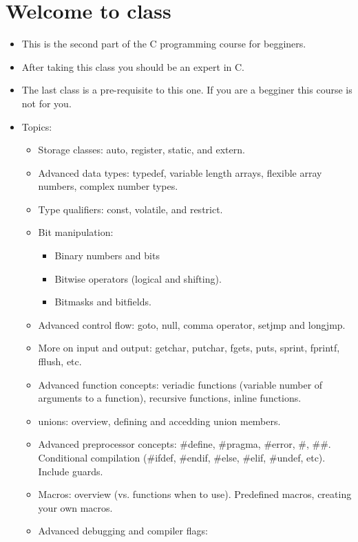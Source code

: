 \section{Welcome to class}
\begin{itemize}
    \item This is the second part of the C programming course for begginers.
    \item After taking this class you should be an expert in C.
    \item The last class is a pre-requisite to this one. If you are a begginer this course is not for you.
    \item Topics:
        \begin{itemize}
            \item Storage classes: auto, register, static, and extern.
            \item Advanced data types: typedef, variable length arrays, flexible array numbers, complex number types.
            \item Type qualifiers: const, volatile, and restrict.
            \item Bit manipulation: 
                \begin{itemize}
                    \item Binary numbers and bits
                    \item Bitwise operators (logical and shifting).
                    \item Bitmasks and bitfields.
                \end{itemize}
            \item Advanced control flow: goto, null, comma operator, setjmp and longjmp.
            \item More on input and output: getchar, putchar, fgets, puts, sprint, fprintf, fflush, etc.
            \item Advanced function concepts: veriadic functions (variable number of arguments to a function), recursive functions, inline functions.
            \item unions: overview, defining and accedding union members.
            \item Advanced preprocessor concepts: \#define, \#pragma, \#error, \#, \#\#. Conditional compilation (\#ifdef, \#endif, \#else, \#elif, \#undef, etc). Include guards.
            \item Macros: overview (vs. functions when to use). Predefined macros, creating your own macros.
            \item Advanced debugging and compiler flags: 

\end{itemize}
\end{itemize}
